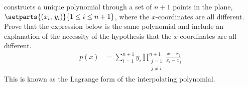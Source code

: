  constructs a unique polynomial through a set of $n+1$ points in the plane, $\setparts{(x_i,\,y_i)}{1\leq i\leq n+1}$, where the $x$-coordinates are all different.  Prove that the expression below is the same polynomial and include an explanation of the necessity of the hypothesis that the $x$-coordinates are all different.
%
\begin{align*}
p(x)&=
\sum_{i=1}^{n+1}
y_i \prod_{\substack{j=1\\j\neq i}}^{n+1}
\frac{x-x_j}{x_i-x_j}
\end{align*}
%
This is known as the Lagrange form of the interpolating polynomial.